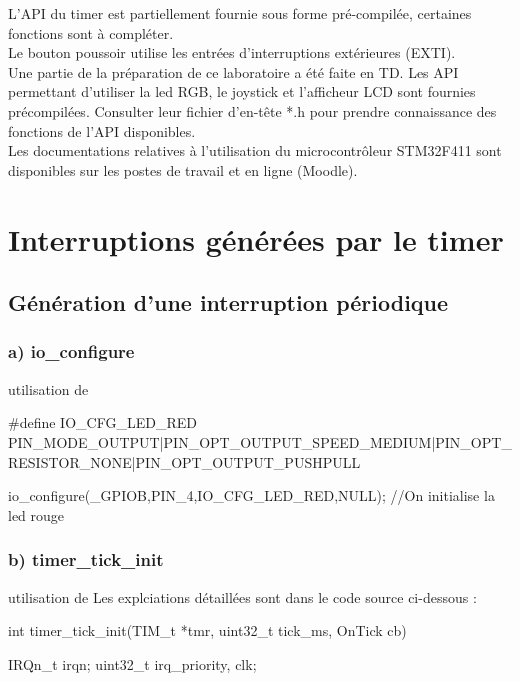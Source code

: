 {L'API du timer est partiellement fournie sous forme pré-compilée, certaines fonctions sont à compléter.\\
Le bouton poussoir utilise les entrées d'interruptions extérieures (EXTI). \\

Une partie de la préparation de ce laboratoire a été
faite en TD. Les API permettant d'utiliser la led RGB, le joystick et l'afficheur LCD sont fournies précompilées. Consulter leur fichier d'en-tête *.h pour prendre connaissance des fonctions de l'API disponibles. \\

Les documentations relatives à l'utilisation du microcontrôleur STM32F411 sont disponibles sur les postes de travail et en ligne (Moodle).

\chapter{Interruptions générées par le timer}

\section{Génération d'une interruption périodique}

\subsection{a) io\_configure}


\begin{Cpp}{utilisation de } 

#define IO_CFG_LED_RED  PIN_MODE_OUTPUT|PIN_OPT_OUTPUT_SPEED_MEDIUM|PIN_OPT_RESISTOR_NONE|PIN_OPT_OUTPUT_PUSHPULL

io_configure(_GPIOB,PIN_4,IO_CFG_LED_RED,NULL); //On initialise la led rouge
    
    
\end{Cpp}

\subsection{b) timer\_tick\_init}


\begin{Cpp}{utilisation de } 
Les explciations détaillées sont dans le code source ci-dessous : 

int timer_tick_init(TIM_t *tmr, uint32_t tick_ms, OnTick cb)
{
	IRQn_t	 irqn;
	uint32_t irq_priority, clk;

}
\end{Cpp}}
